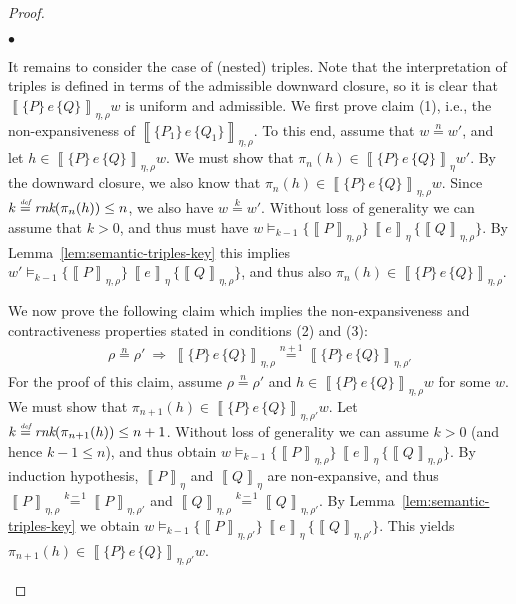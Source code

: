 \documentclass{LMCS}
\theoremstyle{remark}
\newcommand{\defeq}{\ensuremath{\stackrel{\mbox{\tiny \it def}}{=}}}
\newcommand{\triple}[3]{{\ensuremath{\!\left.\{ #1 \}\, #2\, \{  #3 \}\!\right.}}}
\newcommand{\rnk}[1]{\textit{rnk}(#1)}
\newcommand{\den}[1]{\left\llbracket #1
  \right\rrbracket}
\newcommand{\nequiv}[1]{\ensuremath{\mathrel{\stackrel{#1}{=}}}}
\begin{document}
\begin{proof}
\begin{iteMize}{$\bullet$}
\item It remains to consider the case of (nested) triples. Note that the interpretation of triples is defined in terms of the admissible downward closure, so it is clear that $\den{\triple{P}{e}{Q}}_{\eta,\rho}w$ is uniform and admissible. 
We first prove claim (1), i.e., the non-expansiveness of $\den{\triple{P_1}{e}{Q_1}}_{\eta,\rho}$.  
To this end, assume that $w\nequiv n w'$, and let $h\in \den{\triple{P}{e}{Q}}_{\eta,\rho} w$. We must show that $\pi_n(h)\in \den{\triple{P}{e}{Q}}_\eta w'$. 
By the downward closure, we also know that $\pi_n(h)\in \den{\triple{P}{e}{Q}}_{\eta,\rho} w$. 
Since $k\defeq \rnk {\pi_n(h)}\leq n$, we also have $w\nequiv k w'$. Without loss of generality we can assume that $k>0$, and thus must have 
$w\models_{k-1}\triple{\den{P}_{\eta,\rho}}{\den{e}_\eta}{\den{Q}_{\eta,\rho}}$. 
By Lemma~\ref{lem:semantic-triples-key} this implies  
$w'\models_{k-1}\triple{\den{P}_{\eta,\rho}}{\den{e}_\eta}{\den{Q}_{\eta,\rho}}$, and thus also 
$\pi_n(h)\in\den{\triple PeQ}_{\eta,\rho}$.

We now prove the following claim which implies the non-expansiveness and contractiveness properties stated in conditions (2) and (3):
\begin{align*}
\rho\nequiv n\rho'\ \Rightarrow\ 
\den{\triple PeQ}_{\eta,\rho}\nequiv{n{+}1} \den{\triple PeQ}_{\eta,\rho'}
\end{align*}
For the proof of this claim, assume $\rho\nequiv n\rho'$ and $h\in\den{\triple PeQ}_{\eta,\rho}w$ for some $w$. 
We must show that $\pi_{n{+}1}(h)\in \den{\triple PeQ}_{\eta,\rho'}w$. 
Let $k\defeq\rnk{\pi_{n{+}1}(h)}\leq n+1$. Without loss of generality we can assume $k>0$ (and hence $k-1\leq n$), and thus obtain 
$w\models_{k-1}\triple{\den{P}_{\eta,\rho}}{\den{e}_\eta}{\den{Q}_{\eta,\rho}}$. 
By induction hypothesis, $\den{P}_\eta$ and $\den{Q}_\eta$ are non-expansive, and thus
$\den{P}_{\eta,\rho}\nequiv {k{-}1}\den{P}_{\eta,\rho'}$ and 
$\den{Q}_{\eta,\rho}\nequiv {k{-}1}\den{Q}_{\eta,\rho'}$. 
By Lemma~\ref{lem:semantic-triples-key} we obtain 
$w\models_{k-1}\triple{\den{P}_{\eta,\rho'}}{\den{e}_\eta}{\den{Q}_{\eta,\rho'}}$. 
This yields $\pi_{n{+}1}(h)\in \den{\triple PeQ}_{\eta,\rho'}w$.
\end{iteMize}
\end{proof}
\end{document}
